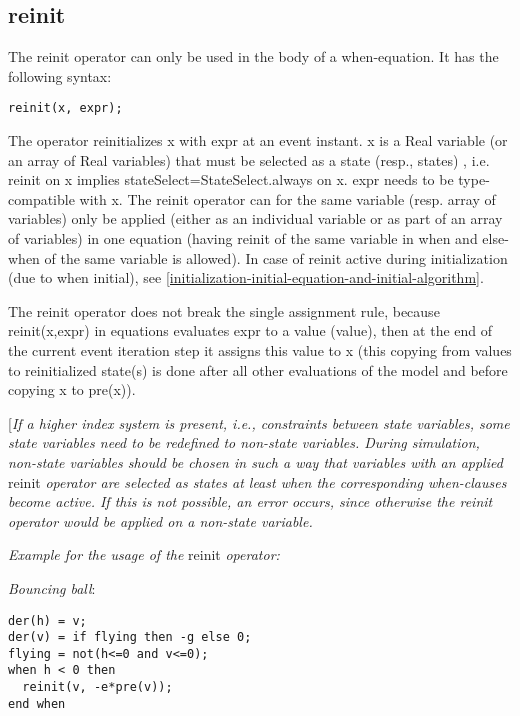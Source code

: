 \subsection{reinit}

The reinit operator can only be used in the body of a when-equation. It
has the following syntax:

\begin{lstlisting}[language=modelica]
reinit(x, expr);
\end{lstlisting}

The operator reinitializes x with expr at an event instant. x is a Real
variable (or an array of Real variables) that must be selected as a
state (resp., states) , i.e. reinit on x implies
stateSelect=StateSelect.always on x. expr needs to be type-compatible
with x. The reinit operator can for the same variable (resp. array of
variables) only be applied (either as an individual variable or as part
of an array of variables) in one equation (having reinit of the same
variable in when and else-when of the same variable is allowed). In case
of reinit active during initialization (due to when initial), see
\autoref{initialization-initial-equation-and-initial-algorithm}.

The reinit operator does not break the single assignment rule, because
reinit(x,expr) in equations evaluates expr to a value (value), then at
the end of the current event iteration step it assigns this value to x
(this copying from values to reinitialized state(s) is done after all
other evaluations of the model and before copying x to pre(x)).

{[}\emph{If a higher index system is present, i.e., constraints between
state variables, some state variables need to be redefined to non-state
variables. During simulation, non-state variables should be chosen in
such a way that variables with an applied} reinit \emph{operator are
selected as states at least when the corresponding when-clauses become
active. If this is not possible, an error occurs, since otherwise the
reinit operator would be applied on a non-state variable.}

\emph{Example for the usage of the} reinit \emph{operator:}

\emph{Bouncing ball}:
\begin{lstlisting}[language=modelica]
der(h) = v;  
der(v) = if flying then -g else 0; 
flying = not(h<=0 and v<=0); 
when h < 0 then
  reinit(v, -e*pre(v)); 
end when
\end{lstlisting}

